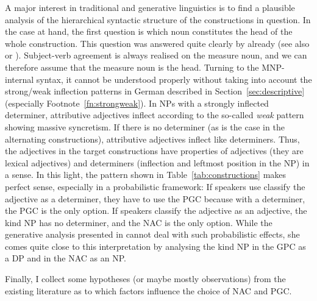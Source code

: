 \documentclass[USenglish]{article}
\begin{document}
A major interest in traditional and generative linguistics is to find a plausible analysis of the hierarchical syntactic structure of the constructions in question.
In the case at hand, the first question is which noun constitutes the head of the whole construction.
This question was answered quite clearly by \cite{Loebel1986} already (see also \citealp[213]{Eschenbach1994} or \citealp[16]{GallmannLindauer1994}).
Subject-verb agreement is always realised on the measure noun, and we can therefore assume that the measure noun is the head.
Turning to the MNP-internal syntax, it cannot be understood properly without taking into account the strong\slash weak inflection patterns in German described in Section~\ref{sec:descriptive} (especially Footnote~\ref{fn:strongweak}).
In NPs with a strongly inflected determiner, attributive adjectives inflect according to the so-called \textit{weak} pattern showing massive syncretism.
If there is no determiner (as is the case in the alternating constructions), attributive adjectives inflect like determiners.
Thus, the adjectives in the target constructions have properties of adjectives (they are lexical adjectives) and determiners (inflection and leftmost position in the NP) in a sense.
In this light, the pattern shown in Table~\ref{tab:constructions} makes perfect sense, especially in a probabilistic framework:
If speakers use classify the adjective as a determiner, they have to use the PGC because with a determiner, the PGC is the only option.
If speakers classify the adjective as an adjective, the kind NP has no determiner, and the NAC is the only option.
While the generative analysis presented in \cite{Bhatt1990} cannot deal with such probabilistic effects, she comes quite close to this interpretation by analysing the kind NP in the GPC as a DP and in the NAC as an NP.





Finally, I collect some hypotheses (or maybe mostly observations) from the existing literature as to which factors influence the choice of NAC and PGC.




\end{document}
